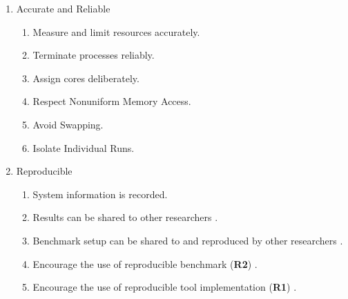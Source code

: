 \begin{enumerate}[noitemsep]
    \item Accurate and Reliable
    \begin{enumerate}[noitemsep]
        \item Measure and limit resources accurately.
        \item Terminate processes reliably.
        \item Assign cores deliberately.
        \item Respect Nonuniform Memory Access.
        \item Avoid Swapping.
        \item Isolate Individual Runs.
    \end{enumerate}

    \item Reproducible
    \begin{enumerate}[noitemsep]
        \item System information is recorded.
        \item Results can be shared to other researchers .
        \item Benchmark setup can be shared to and reproduced by other researchers .
        \item Encourage the use of reproducible benchmark (\textbf{R2}) .
        \item Encourage the use of reproducible tool implementation (\textbf{R1}) .
    \end{enumerate}
\end{enumerate}




